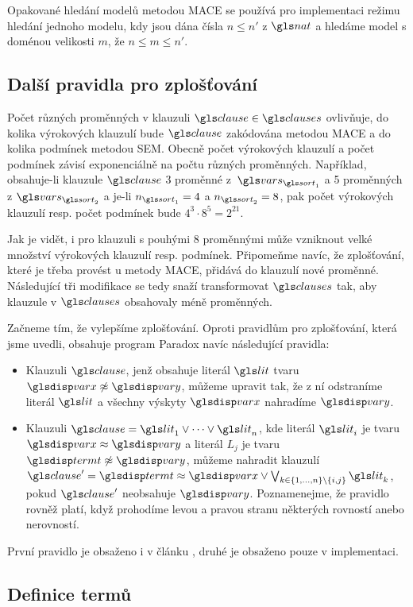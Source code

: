 Opakované hledání modelů metodou MACE se používá pro implementaci
režimu hledání jednoho modelu,
kdy jsou dána čísla $n \leq n'$ z $\nat$ a hledáme
model s doménou velikosti $m$, že $n \leq m \leq n'$.

\subsection{Další pravidla pro zplošťování} \label{sec:flatten-extended}

Počet různých proměnných v klauzuli $\clause \in \clauses$
ovlivňuje, do kolika výrokových klauzulí bude $\clause$
zakódována metodou MACE a do kolika podmínek metodou SEM.
Obecně počet výrokových klauzulí a počet podmínek
závisí exponenciálně na počtu různých proměnných.
Například, obsahuje-li klauzule $\clause$ 3 proměnné z~$\vars_{\sort_1}$
a 5 proměnných z $\vars_{\sort_2}$ a je-li $n_{\sort_1} = 4$
a $n_{\sort_2} = 8$, pak počet výrokových klauzulí resp. počet podmínek
bude $4^3 \cdot 8^5 = 2^{21}$.

Jak je vidět, i pro klauzuli s pouhými 8 proměnnými může vzniknout
velké množství výrokových klauzulí resp. podmínek.
Připomeňme navíc, že zplošťování, které je třeba
provést u metody MACE, přidává do klauzulí nové proměnné.
Následující tři modifikace se tedy snaží transformovat
$\clauses$ tak, aby klauzule v $\clauses$ obsahovaly méně proměnných.

Začneme tím, že vylepšíme zplošťování. Oproti pravidlům
pro zplošťování, která jsme uvedli, obsahuje program Paradox \cite{paradox}
navíc následující pravidla:
\begin{itemize}
\item Klauzuli $\clause$, jenž obsahuje literál $\lit$ tvaru
  $\var \not\approx \varY$, můžeme upravit tak,
  že z ní odstraníme literál $\lit$ a všechny výskyty
  $\var$ nahradíme $\varY$.
\item Klauzuli $\clause = \lit_1 \vee \cdots \vee \lit_n$, kde literál
  $\lit_i$ je tvaru $\var \approx \varY$ a literál $L_j$ je tvaru
  $\term \not\approx \varY$, můžeme nahradit klauzulí
  $\clause' = \term \approx \var \vee
  \bigvee_{k \in \{ 1 \comdots n \} \setminus \{ i, j \}} \lit_k$, pokud $\clause'$
  neobsahuje $\varY$. Poznamenejme, že pravidlo rovněž platí,
  když prohodíme levou a pravou stranu některých rovností anebo nerovností.
\end{itemize}
První pravidlo je obsaženo i v článku \cite{claessen03paradox},
druhé je obsaženo pouze v implementaci.

\subsection{Definice termů}

